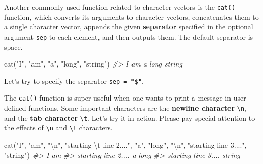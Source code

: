 \documentclass[
]{book}
\newenvironment{Shaded}{\begin{snugshade}}{\end{snugshade}}
\newcommand{\AttributeTok}[1]{\textcolor[rgb]{0.77,0.63,0.00}{#1}}
\newcommand{\CommentTok}[1]{\textcolor[rgb]{0.56,0.35,0.01}{\textit{#1}}}
\newcommand{\FunctionTok}[1]{\textcolor[rgb]{0.00,0.00,0.00}{#1}}
\newcommand{\NormalTok}[1]{#1}
\newcommand{\SpecialCharTok}[1]{\textcolor[rgb]{0.00,0.00,0.00}{#1}}
\newcommand{\StringTok}[1]{\textcolor[rgb]{0.31,0.60,0.02}{#1}}
\begin{document}
Another commonly used function related to character vectors is the \texttt{cat()} function, which converts its arguments to character vectors, concatenates them to a single character vector, appends the given \textbf{separator} specified in the optional argument \texttt{sep} to each element, and then outputs them. The default separator is space.

\begin{Shaded}
\begin{Highlighting}[]
\FunctionTok{cat}\NormalTok{(}\StringTok{"I"}\NormalTok{, }\StringTok{"am"}\NormalTok{, }\StringTok{"a"}\NormalTok{, }\StringTok{"long"}\NormalTok{, }\StringTok{"string"}\NormalTok{)}
\CommentTok{\#\textgreater{} I am a long string}
\end{Highlighting}
\end{Shaded}

Let's try to specify the separator \texttt{sep\ =\ "\$"}.

\begin{Shaded}
\end{Shaded}

The \texttt{cat()} function is super useful when one wants to print a message in user-defined functions. Some important characters are the \textbf{newline character} \texttt{\textbackslash{}n}, and the \textbf{tab character} \texttt{\textbackslash{}t}. Let's try it in action. Please pay special attention to the effects of \texttt{\textbackslash{}n} and \texttt{\textbackslash{}t} characters.

\begin{Shaded}
\begin{Highlighting}[]
\FunctionTok{cat}\NormalTok{(}\StringTok{"I"}\NormalTok{, }\StringTok{"am"}\NormalTok{, }\StringTok{"}\SpecialCharTok{\textbackslash{}n}\StringTok{"}\NormalTok{, }\StringTok{"starting }\SpecialCharTok{\textbackslash{}t}\StringTok{ line 2...."}\NormalTok{, }
    \StringTok{"a"}\NormalTok{, }\StringTok{"long"}\NormalTok{, }\StringTok{"}\SpecialCharTok{\textbackslash{}n}\StringTok{"}\NormalTok{, }\StringTok{"starting line 3...."}\NormalTok{, }\StringTok{"string"}\NormalTok{)}
\CommentTok{\#\textgreater{} I am }
\CommentTok{\#\textgreater{}  starting     line 2.... a long }
\CommentTok{\#\textgreater{}  starting line 3.... string}
\end{Highlighting}
\end{Shaded}
\end{document}
